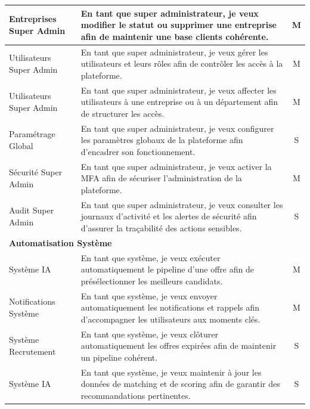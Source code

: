 \begin{longtable}{|p{3.5cm}|p{10cm}|c|}
Entreprises Super Admin & En tant que super administrateur, je veux modifier le statut ou supprimer une entreprise afin de maintenir une base clients cohérente. & M \\ \hline
Utilisateurs Super Admin & En tant que super administrateur, je veux gérer les utilisateurs et leurs rôles afin de contrôler les accès à la plateforme. & M \\ \hline
Utilisateurs Super Admin & En tant que super administrateur, je veux affecter les utilisateurs à une entreprise ou à un département afin de structurer les accès. & M \\ \hline
Paramétrage Global & En tant que super administrateur, je veux configurer les paramètres globaux de la plateforme afin d'encadrer son fonctionnement. & S \\ \hline
Sécurité Super Admin & En tant que super administrateur, je veux activer la MFA afin de sécuriser l'administration de la plateforme. & M \\ \hline
Audit Super Admin & En tant que super administrateur, je veux consulter les journaux d'activité et les alertes de sécurité afin d'assurer la traçabilité des actions sensibles. & S \\ \hline
\multicolumn{3}{|l|}{\textbf{Automatisation Système}} \\ \hline
Système IA & En tant que système, je veux exécuter automatiquement le pipeline d'une offre afin de présélectionner les meilleurs candidats. & M \\ \hline
Notifications Système & En tant que système, je veux envoyer automatiquement les notifications et rappels afin d'accompagner les utilisateurs aux moments clés. & M \\ \hline
Système Recrutement & En tant que système, je veux clôturer automatiquement les offres expirées afin de maintenir un pipeline cohérent. & S \\ \hline
Système IA & En tant que système, je veux maintenir à jour les données de matching et de scoring afin de garantir des recommandations pertinentes. & S \\ \hline
\end{longtable}
